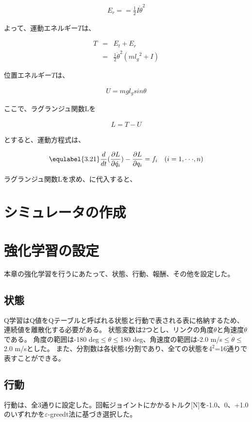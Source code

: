\begin{eqnarray}
  E_{r} =
  =\frac{1}{2}I{\dot{\theta}}^2
\end{eqnarray}

よって、運動エネルギー$T$は、

\begin{eqnarray}
  T
  &=&E_{t} + E_{r} \nonumber \\
  &=&\frac{1}{2}{\dot{\theta}}^2(m{l_{g}}^2 + I)
\end{eqnarray}

位置エネルギー$T$は、

\begin{eqnarray}
  U
  = mgl_{g}sin\theta
\end{eqnarray}

ここで、ラグランジュ関数Lを

\begin{eqnarray}
  L
  =T - U
\end{eqnarray}

とすると、運動方程式は、

\begin{eqnarray}
  \equlabel{3.21}
  \frac{d}{dt}(\frac{\partial L}{\partial \dot{q_{i}}}) - \frac{\partial L}{\partial q_{i}} = f_{i} \quad (i = 1,\cdot\cdot\cdot, n)
\end{eqnarray}

ラグランジュ関数Lを求め、に代入すると、

\section{シミュレータの作成}
\section{強化学習の設定}
本章の強化学習を行うにあたって、状態、行動、報酬、その他を設定した。
\subsection{状態}
Q学習はQ値をQテーブルと呼ばれる状態と行動で表される表に格納するため、連続値を離散化する必要がある。
状態変数は2つとし、リンクの角度$\theta$と角速度$\dot{\theta}$である。
角度の範囲は-180 deg$\leq$$\theta$$\leq$180 deg、角速度の範囲は-2.0 m/s$\leq$$\dot{\theta}$$\leq$2.0 m/sとした。
また、分割数は各状態4分割であり、全ての状態を$4^{2}$=16通りで表すことができる。
\subsection{行動}
行動は、全3通りに設定した。回転ジョイントにかかるトルク[N]を-1.0、0、+1.0のいずれかを$\varepsilon$-greedt法に基づき選択した。
